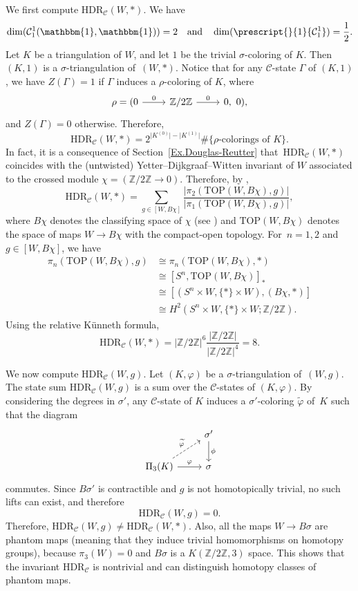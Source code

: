 \documentclass[a4paper, oneside]{amsart}
\newcommand{\Z}{\mathbb{Z}}
\numberwithin{equation}{subsection}
\theoremstyle{referencedlemma}
\theoremstyle{plain} %
\theoremstyle{remark}
\begin{document}
We first compute $\mathrm{HDR}_\mathcal{C}(W,*)$.  We have 
$$
\dim(\mathcal{C}_1^1(\mathbbm{1}, \mathbbm{1})) = 2\quad \text{and} \quad \dim(\prescript{}{1}{\mathcal{C}_1^1}) = \frac{1}{2}.
$$
Let $K$ be a triangulation of $W$,  and let $1$ be the trivial $\sigma$-coloring of $K$. Then $(K,1)$ is a $\sigma$-triangulation of~$(W,*)$. Notice that for any $\mathcal{C}$-state $\Gamma$ of $(K,1)$, we have $Z(\Gamma) =1$ if $\Gamma$ induces a $\rho$-coloring of $K$, where
$$
\begin{tikzcd}
\rho = (0\arrow[r, "0"] & \Z/2\Z\arrow[r, "0"] & 0, \ 0),
\end{tikzcd}
$$
and $Z(\Gamma) = 0$ otherwise. Therefore,
$$
\mathrm{HDR}_\mathcal{C}(W,*) = 2^{\lvert K^{(0)}\rvert - \lvert K^{(1)}\rvert} \#\{\rho\text{-colorings of $K$}\}.
$$
In fact, it is a consequence of Section~\ref{Ex.Douglas-Reutter} that~$\mathrm{HDR}_\mathcal{C}(W,*)$ coincides with the (untwisted) Yetter--Dijkgraaf--Witten invariant of $W$ associated to the crossed module $\chi = (\Z/2\Z \to 0)$.  Therefore, by \cite[Theorem~1.21]{martins_yetters_2007}, 
$$
\mathrm{HDR}_\mathcal{C}(W,*) =\sum_{g \in [W, B\chi]} \frac{\lvert\pi_2(\mathrm{TOP}(W, B\chi), g)\rvert}{\lvert\pi_1(\mathrm{TOP}(W, B\chi), g)\rvert},
$$
where $B\chi$ denotes the classifying space of $\chi$ (see \cite{brown_nonabelian_2011}) and $\mathrm{TOP}(W, B\chi)$ denotes the space of maps $W\to B\chi$ with the compact-open topology. For~$n= 1, 2$ and $g \in [W, B\chi]$, we have
\begin{align*}
\pi_n(\mathrm{TOP}(W, B\chi),g) & \cong \pi_n(\mathrm{TOP}(W, B\chi),*)\\
&\cong [S^n, \mathrm{TOP}(W, B\chi)]_*\\
&\cong [(S^n\times W, \{*\}\times W), (B\chi, *)]\\
&\cong H^2(S^n\times W, \{*\}\times W; \Z/2\Z).
\end{align*}
Using the relative Künneth formula, 
$$
\mathrm{HDR}_\mathcal{C}(W,*) = \lvert \Z/2\Z\rvert^{6}\frac{\lvert\Z/2\Z\rvert}{\lvert \Z/2\Z\rvert^{4}} = 8.
$$

We now compute $\mathrm{HDR}_\mathcal{C}(W,g)$.  Let $(K,\varphi)$ be a $\sigma$-triangulation of~$(W,g)$.  The state sum $\mathrm{HDR}_{\mathcal{C}}(W,g)$ is a sum over the $\mathcal{C}$-states of $(K,\varphi)$. By considering the degrees in $\sigma'$, any $\mathcal{C}$-state of $K$ induces a $\sigma'$-coloring $\widetilde{\varphi}$ of~$K$ such that the diagram 
$$
\begin{tikzcd}
& \sigma' \arrow[d, "\phi"]\\
\Pi_3(K) \arrow[ur, dashed, "\widetilde{\varphi}"] \arrow[r, "\varphi"] & \sigma
\end{tikzcd}
$$
commutes.  Since $B\sigma'$ is contractible and $g$ is not homotopically trivial, no such lifts can exist, and therefore
$$
\mathrm{HDR}_{\mathcal{C}}(W,g) = 0.
$$
Therefore, $\mathrm{HDR}_{\mathcal{C}}(W,g) \neq \mathrm{HDR}_{\mathcal{C}}(W,*)$. Also, all the maps $W \to B\sigma$ are phantom maps (meaning that they induce trivial homomorphisms on homotopy groups), because $\pi_3(W) = 0$ and $B\sigma$  is a $K(\Z/2\Z, 3)$ space.  This shows that the invariant $\mathrm{HDR}_\mathcal{C}$ is nontrivial and can distinguish homotopy classes of phantom maps.  
\end{document}
